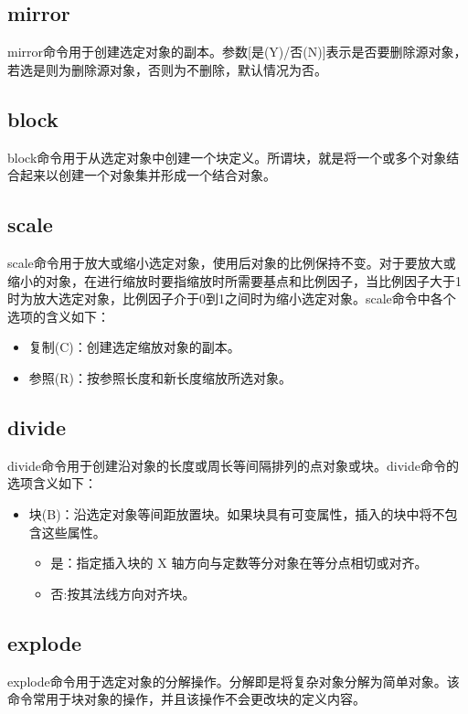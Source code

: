 \subsection{mirror}
mirror命令用于创建选定对象的副本。参数[是(Y)/否(N)]表示是否要删除源对象，若选是则为删除源对象，否则为不删除，默认情况为否。
\subsection{block}
block命令用于从选定对象中创建一个块定义。所谓块，就是将一个或多个对象结合起来以创建一个对象集并形成一个结合对象。
\subsection{scale}
scale命令用于放大或缩小选定对象，使用后对象的比例保持不变。对于要放大或缩小的对象，在进行缩放时要指缩放时所需要基点和比例因子，当比例因子大于1时为放大选定对象，比例因子介于0到1之间时为缩小选定对象。scale命令中各个选项的含义如下：
\begin{itemize}
\item 复制(C)：创建选定缩放对象的副本。
\item 参照(R)：按参照长度和新长度缩放所选对象。
\end{itemize}
\subsection{divide}
divide命令用于创建沿对象的长度或周长等间隔排列的点对象或块。divide命令的选项含义如下：
\begin{itemize}
\item 块(B)：沿选定对象等间距放置块。如果块具有可变属性，插入的块中将不包含这些属性。 
\begin{itemize}
\item 是：指定插入块的 X 轴方向与定数等分对象在等分点相切或对齐。
\item 否:按其法线方向对齐块。
\end{itemize} 
\end{itemize}
\subsection{explode}
explode命令用于选定对象的分解操作。分解即是将复杂对象分解为简单对象。该命令常用于块对象的操作，并且该操作不会更改块的定义内容。
